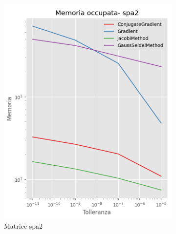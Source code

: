 \begin{figure}[!ht]
\begin{subfigure}{0.45\textwidth}
        \includegraphics[width=\textwidth]{./../report/Progetto_1_bis/img/mem_spa2.png}
        \caption{Matrice spa2}
        \label{fig:mem_spa2}
    \end{subfigure}
    \begin{subfigure}{0.45\textwidth}
        \centering

\end{subfigure}
\end{figure}
